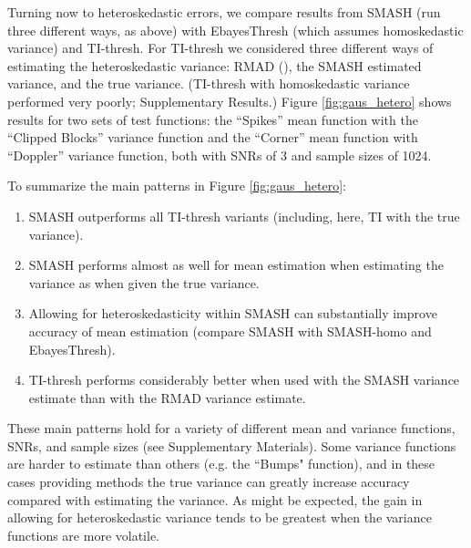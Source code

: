 \documentclass[12pt]{article}
\begin{document}
Turning now to heteroskedastic errors, we compare results from SMASH (run three different ways, as above) with EbayesThresh (which assumes
homoskedastic variance) and TI-thresh. For TI-thresh we considered three different ways of estimating the heteroskedastic variance: RMAD 
(\cite{Gao1997Wavelet}), the SMASH estimated variance, and the true variance. (TI-thresh with homoskedastic variance performed very poorly; Supplementary Results.) Figure \ref{fig:gaus_hetero} 
shows results for two sets of test functions: the ``Spikes'' mean function with the ``Clipped Blocks'' variance function and the ``Corner'' mean function with ``Doppler'' variance function, both with SNRs of 3 and sample sizes of 1024. 

To summarize the main patterns in Figure \ref{fig:gaus_hetero}:
\begin{enumerate}
\item SMASH outperforms all TI-thresh variants (including, here, TI with the true variance).
\item SMASH performs almost as well for mean estimation when estimating the variance as when given the true variance.
\item Allowing for heteroskedasticity within SMASH can substantially improve accuracy of mean estimation (compare SMASH with SMASH-homo and EbayesThresh).
\item TI-thresh performs considerably better when used with the SMASH variance estimate than with the RMAD variance estimate.
\end{enumerate}

These main patterns hold for a variety of different mean and variance functions, SNRs, and sample sizes (see Supplementary Materials). Some variance functions are harder to estimate than others (e.g. the ``Bumps" function), and in these cases providing methods the true variance can greatly increase
accuracy compared with estimating the variance. 
As might be expected, the gain in allowing for heteroskedastic variance tends to be greatest when the variance functions are more
volatile.
\end{document}
